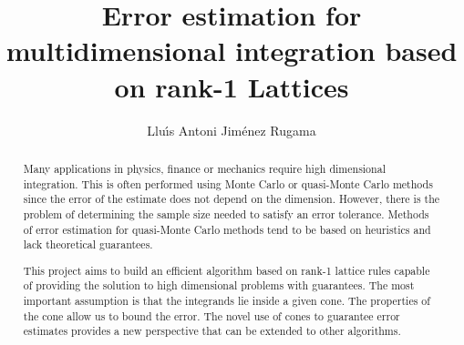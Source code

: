 \documentclass[]{elsarticle}
\theoremstyle{definition}
\begin{document}
\begin{frontmatter}

\title{Error estimation for multidimensional integration based on rank-1 Lattices}
\author{Llu\'{\i}s Antoni Jim\'{e}nez Rugama}
\begin{abstract}

Many applications in physics, finance or mechanics require high dimensional integration.  This is often performed using Monte Carlo or quasi-Monte Carlo methods since the error of the estimate does not depend on the dimension.  However, there is the problem of determining the sample size needed to satisfy an error tolerance.  Methods of error estimation for quasi-Monte Carlo methods tend to be based on heuristics and lack theoretical guarantees.

This project aims to build an efficient algorithm based on rank-1 lattice rules capable of providing the solution to high dimensional problems with guarantees. The most important assumption is that the integrands lie inside a given cone. The properties of the cone allow us to bound the error. The novel use of cones to guarantee error estimates provides a new perspective that can be extended to other algorithms.
\end{abstract}

\end{frontmatter}
\end{document}

